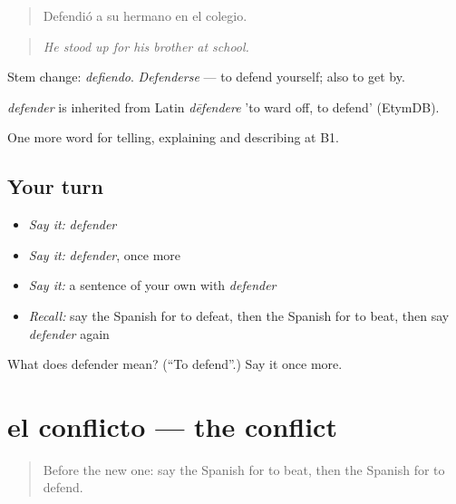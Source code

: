 \begin{quote}
Defendió a su hermano en el colegio.
\end{quote}

\begin{quote}
\emph{He stood up for his brother at school.}
\end{quote}

Stem change: \emph{defiendo}. \emph{Defenderse} — to defend yourself; also to get by.

\begin{cousinweb}
\emph{defender} is inherited from Latin \emph{dēfendere} 'to ward off, to defend' (EtymDB).
\end{cousinweb}

\begin{grammarlens}[title={What you've built}]
One more word for telling, explaining and describing at B1.
\end{grammarlens}

\subsection*{Your turn}
\begin{itemize}
\raggedright
  \item \emph{Say it:} \emph{defender}
  \item \emph{Say it:} \emph{defender}, once more
  \item \emph{Say it:} a sentence of your own with \emph{defender}
  \item \emph{Recall:} say the Spanish for to defeat, then the Spanish for to beat, then say \emph{defender} again
\end{itemize}

\begin{tcolorbox}[breakable,colback=teal!4,colframe=teal!35!black,title={Before you move on}]
What does defender mean? (\textquotedblleft{}To defend\textquotedblright{}.) Say it once more.
\end{tcolorbox}
\section[el conflicto]{el conflicto — the conflict}

\label{lesson:ES-C569-conflicto}



\begin{quote}
Before the new one: say the Spanish for to beat, then the Spanish for to defend.
\end{quote}

